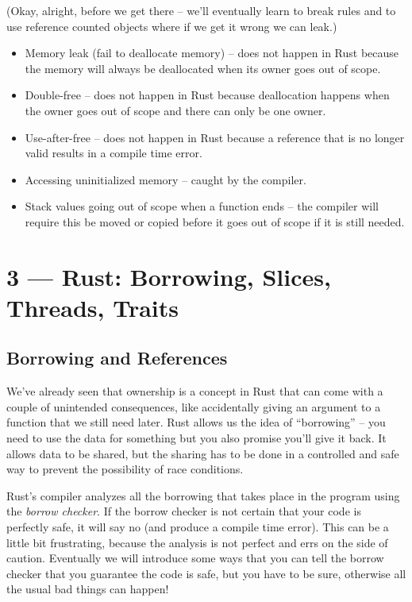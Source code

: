 \documentclass[a4paper]{report}
\begin{document}
(Okay, alright, before we get there -- we'll eventually learn to break rules and to use reference counted objects where if we get it wrong we can leak.)

\begin{itemize}
	\item Memory leak (fail to deallocate memory) -- does not happen in Rust because the memory will always be deallocated when its owner goes out of scope.
	\item Double-free -- does not happen in Rust because deallocation happens when the owner goes out of scope and there can only be one owner.
	\item Use-after-free -- does not happen in Rust because a reference that is no longer valid results in a compile time error.
	\item Accessing uninitialized memory -- caught by the compiler.
	\item Stack values going out of scope when a function ends -- the compiler will require this be moved or copied before it goes out of scope if it is still needed.
\end{itemize}









\chapter*{3 --- Rust: Borrowing, Slices, Threads, Traits}


\section*{Borrowing and References}
We've already seen that ownership is a concept in Rust that can come with a couple of unintended consequences, like accidentally giving an argument to a function that we still need later. Rust allows us the idea of ``borrowing'' -- you need to use the data for something but you also promise you'll give it back. It allows data to be shared, but the sharing has to be done in a controlled and safe way to prevent the possibility of race conditions.

Rust's compiler analyzes all the borrowing that takes place in the program using the \textit{borrow checker}. If the borrow checker is not certain that your code is perfectly safe, it will say no (and produce a compile time error). This can be a little bit frustrating, because the analysis is not perfect and errs on the side of caution. Eventually we will introduce some ways that you can tell the borrow checker that you guarantee the code is safe, but you have to be sure, otherwise all the usual bad things can happen!
\end{document}

